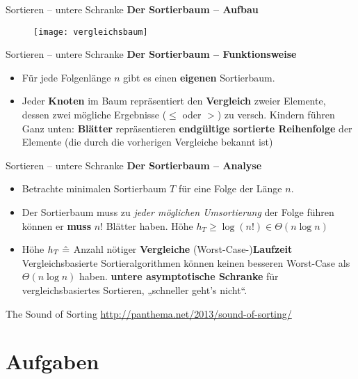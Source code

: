 \begin{frame}{Sortieren – untere Schranke}
	\textbf{Der Sortierbaum -- Aufbau}
	\begin{figure}[htp]
		\centering
		\texttt{[image: vergleichsbaum]}
	\end{figure}
\end{frame}

\begin{frame}{Sortieren – untere Schranke}
	\textbf{Der Sortierbaum -- Funktionsweise}
	\pause
	\begin{itemize}
		\item Für jede Folgenlänge $n$ gibt es einen \textbf{eigenen} Sortierbaum.
		\pause
		\item Jeder \textbf{Knoten} im Baum repräsentiert den \textbf{Vergleich} zweier Elemente, dessen zwei mögliche Ergebnisse ($\leq$ oder $>$) zu versch. Kindern führen
		\pause
		\implitem Ganz unten: \textbf{Blätter} repräsentieren \textbf{endgültige sortierte Reihenfolge} der Elemente (die durch die vorherigen Vergleiche bekannt ist)
	\end{itemize}
\end{frame}

\begin{frame}{Sortieren – untere Schranke}
	\textbf{Der Sortierbaum -- Analyse}
	\pause
	\begin{itemize}
		\item Betrachte minimalen Sortierbaum $T$ für eine Folge der Länge $n$.
		\pause
		\item Der Sortierbaum muss zu \textit{jeder möglichen Umsortierung} der Folge führen können \impl er \textbf{muss} $n!$ Blätter haben.
		\pause
		\implitem Höhe $h_T \geq \log(n!) \in \Theta(n \log n)$ 
		\pause
		\item Höhe $h_T \mathrel{\hat{=}}$ Anzahl nötiger \textbf{Vergleiche} \entspr (Worst-Case-)\textbf{Laufzeit}
		\Implitem Vergleichsbasierte Sortieralgorithmen können keinen besseren Worst-Case als $\Theta(n\log n)$ haben.
		\pause
		\implitem \textbf{untere asymptotische Schranke} für vergleichsbasiertes Sortieren, „schneller geht's nicht“. \quad\qedsymbol
	\end{itemize}
\end{frame}

\begin{frame}{The Sound of Sorting}
	\url{http://panthema.net/2013/sound-of-sorting/}
\end{frame}

\section{Aufgaben}


